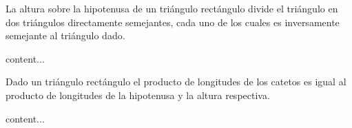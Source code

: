 






\begin{problema}
	La altura sobre la hipotenusa de un triángulo rectángulo divide el triángulo en dos triángulos directamente semejantes, cada uno de los cuales es inversamente semejante al triángulo dado. 
\end{problema}
\begin{dem}
	content...
\end{dem}

\begin{problema}
	Dado un triángulo rectángulo el producto de longitudes de los catetos es igual al producto de longitudes de la hipotenusa y la altura respectiva.
\end{problema}
\begin{dem}
	content...
\end{dem}







